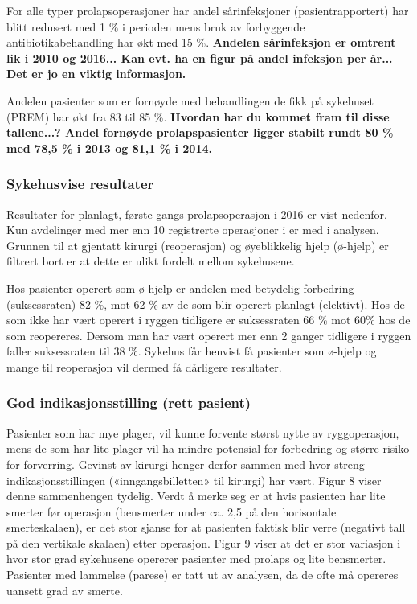 \documentclass [norsk,a4paper,twoside]{article}\usepackage[]{graphicx}\usepackage[]{color}
\begin{document}
For alle typer prolapsoperasjoner har
andel sårinfeksjoner (pasientrapportert) har blitt redusert med 1 \% i perioden mens
bruk av forbyggende antibiotikabehandling har økt med 15 \%. 
\textbf{Andelen sårinfeksjon er omtrent lik i 2010 og 2016... Kan evt. ha en figur på andel infeksjon per år... Det er jo en viktig informasjon.}

Andelen
pasienter som er fornøyde med behandlingen de fikk på sykehuset (PREM) har økt
fra 83 til 85 \%. \textbf{Hvordan har du kommet fram til disse tallene...? Andel fornøyde prolapspasienter ligger stabilt rundt 80 \% med 78,5 \% i 2013 og 81,1 \% i 2014.}


\subsubsection{Sykehusvise resultater}



Resultater for planlagt, første gangs prolapsoperasjon i 2016 er vist
nedenfor. Kun avdelinger med mer enn 10 registrerte operasjoner i er med i
analysen. Grunnen til at gjentatt kirurgi (reoperasjon) og øyeblikkelig hjelp (ø-hjelp)
er filtrert bort er at dette er ulikt fordelt mellom sykehusene.


Hos pasienter operert som ø-hjelp er andelen med betydelig forbedring
(suksessraten) 82 \%, mot 62 \% av de som blir operert planlagt (elektivt).
Hos de som ikke har vært operert i ryggen tidligere er suksessraten 66 \% mot 60\%
hos de som reopereres. Dersom man har vært operert mer enn 2 ganger tidligere i
ryggen faller suksessraten til 38 \%. Sykehus får henvist få pasienter som ø-hjelp og
mange til reoperasjon vil dermed få dårligere resultater.






\subsubsection{God indikasjonsstilling (rett pasient)}

Pasienter som har mye plager, vil kunne forvente størst nytte av ryggoperasjon,
mens de som har lite plager vil ha mindre potensial for forbedring og større risiko
for forverring. Gevinst av kirurgi henger derfor sammen med hvor streng
indikasjonsstillingen («inngangsbilletten» til kirurgi) har vært. Figur 8 viser denne
sammenhengen tydelig. Verdt å merke seg er at hvis pasienten har lite smerter før
operasjon (bensmerter under ca. 2,5 på den horisontale smerteskalaen), er det stor
sjanse for at pasienten faktisk blir verre (negativt tall på den vertikale skalaen) etter
operasjon. Figur 9 viser at det er stor variasjon i hvor stor grad sykehusene opererer
pasienter med prolaps og lite bensmerter. Pasienter med lammelse (parese) er tatt
ut av analysen, da de ofte må opereres uansett grad av smerte.
\end{document}
